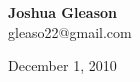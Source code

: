 \begin{titlepage}
\begin{center}



  \vspace*{0.2\textheight}

  { \large \bfseries Joshua Gleason}\\
  { \large gleaso22@gmail.com}\\

\vspace*{\fill}

{\large December 1, 2010}

\end{center}

\end{titlepage}

